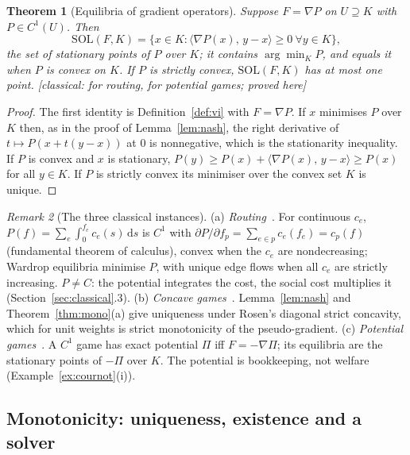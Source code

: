 \documentclass[11pt,a4paper]{article}
\theoremstyle{plain}
\newtheorem{theorem}{Theorem}[section]
\theoremstyle{definition}
\theoremstyle{remark}
\newtheorem{remark}[theorem]{Remark}
\newcommand{\SOL}{\mathrm{SOL}}
\newcommand{\dd}{\mathrm{d}}
\newcommand{\ip}[2]{\langle #1,\,#2\rangle}
\newcommand{\status}[1]{\textsf{\small [#1]}}
\begin{document}
\begin{theorem}[Equilibria of gradient operators]\label{thm:potential}
Suppose $F=\nabla P$ on $U\supseteq K$ with $P\in C^1(U)$. Then
\[
\SOL(F,K)=\{x\in K:\ip{\nabla P(x)}{y-x}\ge 0\ \forall y\in K\},
\]
the set of stationary points of $P$ over $K$; it contains $\arg\min_KP$, and equals it when $P$ is convex on $K$. If $P$ is strictly convex, $\SOL(F,K)$ has at most one point. \status{classical: \citealp{beckmann1956} for routing, \citealp{mondererShapley1996} for potential games; proved here}
\end{theorem}
\begin{proof}
The first identity is Definition~\ref{def:vi} with $F=\nabla P$. If $x$ minimises $P$ over $K$ then, as in the proof of Lemma~\ref{lem:nash}, the right derivative of $t\mapsto P(x+t(y-x))$ at $0$ is nonnegative, which is the stationarity inequality. If $P$ is convex and $x$ is stationary, $P(y)\ge P(x)+\ip{\nabla P(x)}{y-x}\ge P(x)$ for all $y\in K$. If $P$ is strictly convex its minimiser over the convex set $K$ is unique.
\end{proof}

\begin{remark}[The three classical instances]\label{rem:instances}
(a) \emph{Routing}~\citep{beckmann1956}. For continuous $c_e$, $P(f)=\sum_e\int_0^{f_e}c_e(s)\,\dd s$ is $C^1$ with $\partial P/\partial f_p=\sum_{e\in p}c_e(f_e)=c_p(f)$ (fundamental theorem of calculus), convex when the $c_e$ are nondecreasing; Wardrop equilibria minimise $P$, with unique edge flows when all $c_e$ are strictly increasing. $P\ne C$: the potential integrates the cost, the social cost multiplies it (Section~\ref{sec:classical}.3).
(b) \emph{Concave games}~\citep{rosen1965}. Lemma~\ref{lem:nash} and Theorem~\ref{thm:mono}(a) give uniqueness under Rosen's diagonal strict concavity, which for unit weights is strict monotonicity of the pseudo-gradient.
(c) \emph{Potential games}~\citep{mondererShapley1996}. A $C^1$ game has exact potential $\Pi$ iff $F=-\nabla\Pi$; its equilibria are the stationary points of $-\Pi$ over $K$. The potential is bookkeeping, not welfare (Example~\ref{ex:cournot}(i)).
\end{remark}

\subsection{Monotonicity: uniqueness, existence and a solver}
\end{document}

